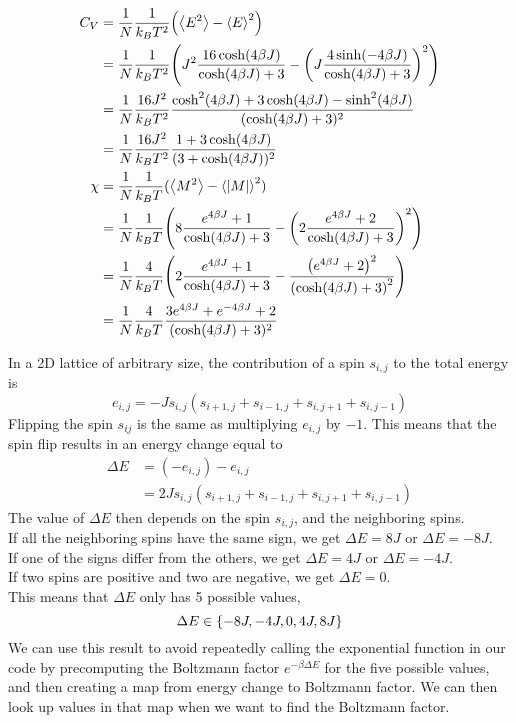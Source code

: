 \documentclass[english,notitlepage,reprint,nofootinbib]{revtex4-2}
\begin{document}
\begin{align*}
    C_V &= \frac{1}{N} \frac{1}{k_B T^2}\qty(\avg{E^2} - \avg{E}^2) \\
    &= \frac{1}{N} \frac{1}{k_B T^2}\qty(J^2\frac{16\cosh(4\beta J)}{\cosh(4\beta J) + 3} - \qty(J\frac{4\sinh(-4\beta J)}{\cosh(4\beta J) + 3})^2) \\
    &= \frac{1}{N} \frac{16J^2}{k_B T^2}\frac{\cosh[2](4\beta J) + 3\cosh(4\beta J) - \sinh[2](4\beta J)}{(\cosh(4\beta J) + 3)^2} \\
    &= \frac{1}{N} \frac{16J^2}{k_B T^2}\frac{1 + 3 \cosh(4\beta J)}{(3 + \cosh(4\beta J))^2} \\
    \chi &= \frac{1}{N} \frac{1}{k_B T}(\avg{M^2} - \avg{|M|}^2) \\
    &= \frac{1}{N} \frac{1}{k_B T}\qty(8\frac{e^{4\beta J} + 1}{\cosh(4\beta J) + 3} - \qty(2\frac{e^{4\beta J} + 2}{\cosh(4\beta J) + 3})^2) \\
    &= \frac{1}{N} \frac{4}{k_B T}\qty(2\frac{e^{4\beta J} + 1}{\cosh(4\beta J) + 3} - \frac{\qty(e^{4\beta J} + 2)^2}{\qty(\cosh(4\beta J) + 3)^2}) \\
    &= \frac{1}{N} \frac{4}{k_B T} \frac{3e^{4\beta J} + e^{-4\beta J} + 2}{(\cosh(4\beta J) + 3)^2}
\end{align*}

In a 2D lattice of arbitrary size, the contribution of a spin $s_{i,j}$ to the total energy is 
$$e_{i,j} = -Js_{i,j}(s_{i+1,j} + s_{i-1,j} + s_{i,j+1} + s_{i,j-1})$$
Flipping the spin $s_{ij}$ is the same as multiplying $e_{i,j}$ by $-1$. This means that the spin flip results in an energy change equal to 
\begin{align*}
    \Delta E &= (-e_{i,j}) - e_{i,j} \\ 
    &= 2Js_{i,j}(s_{i+1,j} + s_{i-1,j} + s_{i,j+1} + s_{i,j-1})
\end{align*}
The value of $\Delta E$ then depends on the spin $s_{i,j}$, and the neighboring spins.  \\
If all the neighboring spins have the same sign, we get $\Delta E = 8J$ or $\Delta E = -8J$. \\
If one of the signs differ from the others, we get $\Delta E = 4J$ or $\Delta E = -4J$. \\
If two spins are positive and two are negative, we get $\Delta E = 0$.  \\
This means that $\Delta E$ only has 5 possible values,
$$
    \Delta E \in \qty{-8J, -4J, 0, 4J, 8J}
$$ 
We can use this result to avoid repeatedly calling the exponential function in our code by precomputing the Boltzmann factor $e^{-\beta \Delta E}$
for the five possible values, and then creating a map from energy change to Boltzmann factor. We can then look up values in that map when we want
to find the Boltzmann factor.
\end{document}
